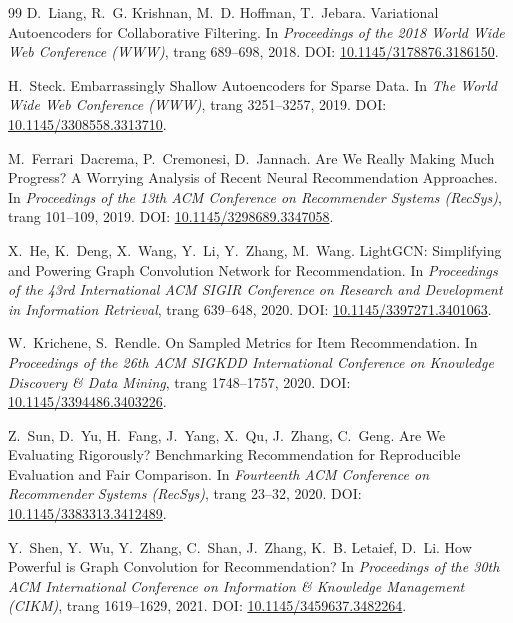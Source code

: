 \begin{thebibliography}{99}
D.~Liang, R.~G. Krishnan, M.~D. Hoffman, T.~Jebara.
\newblock Variational Autoencoders for Collaborative Filtering.
\newblock In \emph{Proceedings of the 2018 World Wide Web Conference (WWW)}, trang 689--698, 2018.
\newblock DOI: \href{https://doi.org/10.1145/3178876.3186150}{10.1145/3178876.3186150}.

H.~Steck.
\newblock Embarrassingly Shallow Autoencoders for Sparse Data.
\newblock In \emph{The World Wide Web Conference (WWW)}, trang 3251--3257, 2019.
\newblock DOI: \href{https://doi.org/10.1145/3308558.3313710}{10.1145/3308558.3313710}.

M.~Ferrari~Dacrema, P.~Cremonesi, D.~Jannach.
\newblock Are We Really Making Much Progress? A Worrying Analysis of Recent Neural Recommendation Approaches.
\newblock In \emph{Proceedings of the 13th ACM Conference on Recommender Systems (RecSys)}, trang 101--109, 2019.
\newblock DOI: \href{https://doi.org/10.1145/3298689.3347058}{10.1145/3298689.3347058}.

X.~He, K.~Deng, X.~Wang, Y.~Li, Y.~Zhang, M.~Wang.
\newblock LightGCN: Simplifying and Powering Graph Convolution Network for Recommendation.
\newblock In \emph{Proceedings of the 43rd International ACM SIGIR Conference on Research and Development in Information Retrieval}, trang 639--648, 2020.
\newblock DOI: \href{https://doi.org/10.1145/3397271.3401063}{10.1145/3397271.3401063}.

W.~Krichene, S.~Rendle.
\newblock On Sampled Metrics for Item Recommendation.
\newblock In \emph{Proceedings of the 26th ACM SIGKDD International Conference on Knowledge Discovery \& Data Mining}, trang 1748--1757, 2020.
\newblock DOI: \href{https://doi.org/10.1145/3394486.3403226}{10.1145/3394486.3403226}.

Z.~Sun, D.~Yu, H.~Fang, J.~Yang, X.~Qu, J.~Zhang, C.~Geng.
\newblock Are We Evaluating Rigorously? Benchmarking Recommendation for Reproducible Evaluation and Fair Comparison.
\newblock In \emph{Fourteenth ACM Conference on Recommender Systems (RecSys)}, trang 23--32, 2020.
\newblock DOI: \href{https://doi.org/10.1145/3383313.3412489}{10.1145/3383313.3412489}.

Y.~Shen, Y.~Wu, Y.~Zhang, C.~Shan, J.~Zhang, K.~B. Letaief, D.~Li.
\newblock How Powerful is Graph Convolution for Recommendation?
\newblock In \emph{Proceedings of the 30th ACM International Conference on Information \& Knowledge Management (CIKM)}, trang 1619--1629, 2021.
\newblock DOI: \href{https://doi.org/10.1145/3459637.3482264}{10.1145/3459637.3482264}.


\end{thebibliography}
